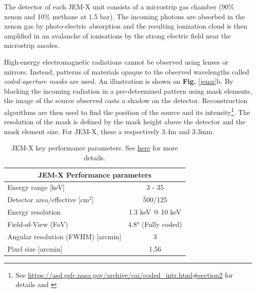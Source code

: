         The detector of each JEM-X unit consists of a microstrip gas chamber (90\% xenon and 10\% methane at 1.5 bar). The incoming photons are absorbed in the xenon gas by photo-electric absorption and the resulting ionization cloud is then amplified in an avalanche of ionisations by the strong electric field near the microstrip anodes\cite{2020ISDCManual}.

        High-energy electromagnetic radiations cannot be observed using lenses or mirrors. Instead, patterns of materials opaque to the observed wavelengths called \textit{coded-aperture masks} are used. An illustration is shown on \textbf{Fig.} \ref{jemx}b. By blocking the incoming radiation in a pre-determined pattern using mask elements, the image of the source observed casts a shadow on the detector. Reconstruction algorithms are then used to find the position of the source and its intensity\footnote{See \url{https://asd.gsfc.nasa.gov/archive/cai/coded_intr.html\#section2} for details and \cite{Dicke1968SCATTER-HOLERAYS}}. The resolution of the mask is defined by the mask height above the detector and the mask element size. For JEM-X, these a respectively 3.4m and 3.3mm\cite{2020ISDCManual}.


        \begin{table}[H]
        \centering
        \begin{tabular}{@{}lc@{}}
        \toprule
        \multicolumn{2}{c}{\textbf{JEM-X Performance parameters}} \\ \midrule
        Energy range [keV]                  & 3 - 35              \\
        Detector area/effective [cm$^2$]    & 500/125             \\
        Energy resolution                   & 1.3 keV @ 10 keV    \\
        Field-of-View (FoV)                 & 4.8° (Fully coded)  \\
        Angular resolution (FWHM) [arcmin]  & 3                   \\ 
        Pixel size [arcmin]                 & 1.56               
        \end{tabular}
        \caption{JEM-X key performance parameters. See \href{https://www.cosmos.esa.int/web/integral/instruments-jemx}{here} for more details.}
        \label{jemx_perf}
        \end{table}
        
